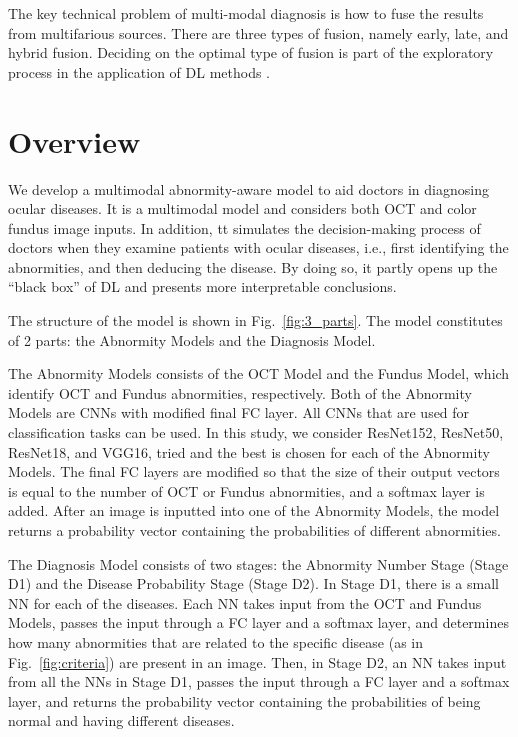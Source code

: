 \documentclass{article}
\begin{document}
		The key technical problem of multi-modal diagnosis is how to fuse the results from multifarious sources.  There are three types of fusion, namely early, late, and hybrid fusion.  Deciding on the optimal type of fusion is part of the exploratory process in the application of DL methods \autocite{Ichhpujani_Thakur_2021}.
		
		
	
	\section{Overview}
		
		We develop a multimodal abnormity-aware model to aid doctors in diagnosing ocular diseases. It is a multimodal model and considers both OCT and color fundus image inputs. In addition, tt simulates the decision-making process of doctors when they examine patients with ocular diseases, i.e., first identifying the abnormities, and then deducing the disease. By doing so, it partly opens up the ``black box'' of DL and presents more interpretable conclusions. 
		
		The structure of the model is shown in Fig.~\ref{fig:3_parts}. The model constitutes of 2 parts: the Abnormity Models and the Diagnosis Model. 
		
		The Abnormity Models consists of the OCT Model and the Fundus Model, which identify OCT and Fundus abnormities, respectively. Both of the Abnormity Models are CNNs with modified final FC layer. All CNNs that are used for classification tasks can be used. In this study, we consider ResNet152, ResNet50, ResNet18, and VGG16, tried and the best is chosen for each of the Abnormity Models. The final FC layers are modified so that the size of their output vectors is equal to the number of OCT or Fundus abnormities, and a softmax layer is added. After an image is inputted into one of the Abnormity Models, the model returns a probability vector containing the probabilities of different abnormities.
		
		The Diagnosis Model consists of two stages: the Abnormity Number Stage (Stage D1) and the Disease Probability Stage (Stage D2). In Stage D1, there is a small NN for each of the diseases. Each NN takes input from the OCT and Fundus Models, passes the input through a FC layer and a softmax layer, and determines how many abnormities that are related to the specific disease (as in Fig.~\ref{fig:criteria}) are present in an image. Then, in Stage D2, an NN takes input from all the NNs in Stage D1, passes the input through a FC layer and a softmax layer, and returns the probability vector containing the probabilities of being normal and having different diseases.
		
\end{document}
